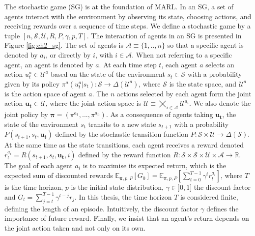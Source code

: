 The stochastic game (SG) \citep{stochasticGames} is at the foundation of MARL.
In an SG, a set of agents interact with the environment by observing its state, choosing actions, and receiving rewards over a sequence of time steps.
We define a stochastic game by a tuple $[n, \mathcal{S}, \mathcal{U}, R, P, \gamma, p, T]$.
The interaction of agents in an SG is presented in Figure \ref{fig:ch2_sg}.
The set of agents is $\mathcal{A} \equiv \{1,..,n\}$ so that a specific agent is denoted by $a_i$,  or directly by $i$, with $i \in \mathcal{A}$.
When not referring to a specific agent, an agent is denoted by $a$.
At each time step $t$, each agent $a$ selects an action $u_t^a \in \mathcal{U}^a$ based on the state of the environment $s_t \in \mathcal{S}$ with a probability given by its policy $\pi^a(u^a_t|s_t): \mathcal{S} \rightarrow \Delta(\mathcal{U}^a)$, where $\mathcal{S}$ is the state space, and $\mathcal{U}^a$ is the action space of agent $a$.
The $n$ actions selected by each agent form the joint action $\mathbf{u_t} \in \mathcal{U}$, where the joint action space is $\mathcal{U} \equiv \bigtimes_{i \in \mathcal{A}} \mathcal{U}^{a_i}$.
We also denote the joint policy by $\mathbf{\pi} = (\pi^{a_1},...,\pi^{a_n})$.
As a consequence of agents taking $\mathbf{u_t}$, the state of the environment $s_t$ transits to a new state $s_{t+1}$ with a probability $P(s_{t+1}, s_t, \mathbf{u_t})$ defined by the stochastic transition function $P:\mathcal{S} \times \mathcal{U} \rightarrow \Delta(\mathcal{S})$.
At the same time as the state transitions, each agent receives a reward denoted $r_t^{a_i} = R(s_{t+1}, s_t, \mathbf{u_t}, i)$ defined by the reward function $R: \mathcal{S} \times \mathcal{S} \times \mathcal{U} \times \mathcal{A} \rightarrow \mathbb{R}$.
The goal of each agent $a_i$ is to maximise its expected return, which is the expected sum of discounted rewards $\mathbb{E}_{\mathbf{\pi}, p, P}\left[ G_0 \right] =\mathbb{E}_{\mathbf{\pi}, p, P}\left[ \sum_{t=0}^{T-1} \gamma^t r^{a_i}_t \right]$, where $T$ is the time horizon, $p$ is the initial state distribution, $\gamma \in ]0, 1]$ the discount factor and $G_t= \sum_{j=t}^{T-1} \gamma^{t-j} r_{j}$.
In this thesis, the time horizon $T$ is considered finite, defining the length of an episode.
Intuitively, the discount factor $\gamma$ defines the importance of future reward.
Finally, we insist that an agent's return depends on the joint action taken and not only on its own.

